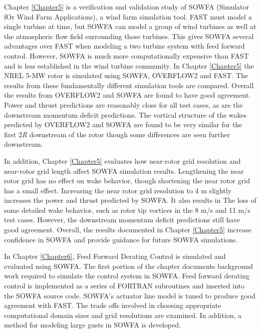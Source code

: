 Chapter \ref{Chapter5} is a verification and validation study of SOWFA (Simulator fOr Wind Farm Applications), a wind farm simulation tool. FAST must model a single turbine at time, but SOWFA can model a group of wind turbines as well at the atmospheric flow field surrounding those turbines. This gives SOWFA several advantages over FAST when modeling a two turbine system with feed forward control. However, SOWFA is much more computationally expensive than FAST and is less established in the wind turbine community. In Chapter \ref{Chapter5} the NREL 5-MW rotor is simulated using SOWFA, OVERFLOW2 and FAST. The results from these fundamentally different simulation tools are compared. Overall the results from OVERFLOW2 and SOWFA are found to have good agreement.  Power and thrust predictions are reasonably close for all test cases, as are the downstream momentum deficit predictions. The vortical structure of the wakes predicted by OVERFLOW2 and SOWFA are found to be very similar for the first 2\emph{R} downstream of the rotor though some differences are seen further downstream.

In addition, Chapter \ref{Chapter5} evaluates how near-rotor grid resolution and near-rotor grid length affect SOWFA simulation results. Lengthening the near rotor grid has no effect on wake behavior, though shortening the near rotor grid has a small effect. Increasing the near rotor grid resolution to 4 m slightly increases the power and thrust predicted by SOWFA. It also results in The loss of some detailed wake behavior, such as rotor tip vortices in the 8 m/s and 11 m/s test cases. However, the downstream momentum deficit predictions still have good agreement. Overall, the results documented in Chapter \ref{Chapter5} increase confidence in SOWFA and provide guidance for future SOWFA simulations.

In Chapter \ref{Chapter6}, Feed Forward Derating Control is simulated and evaluated using SOWFA. The first portion of the chapter documents background work required to simulate the control system in SOWFA. Feed forward derating control is implemented as a series of FORTRAN subroutines and inserted into the SOWFA source code. SOWFA$'$s actuator line model is tuned to produce good agreement with FAST. The trade offs involved in choosing appropriate computational domain sizes and grid resolutions are examined. In addition, a method for modeling large gusts in SOWFA is developed.

